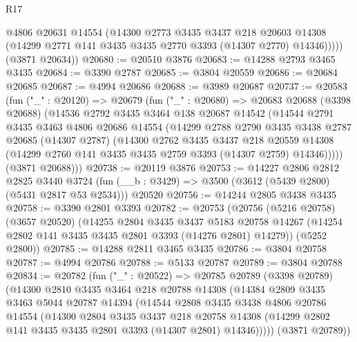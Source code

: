 \begin{lexlean}{R17}
\begin{coremodule}
            @4806
            @20631
            @14554
            (@14300
              @2773
              @3435
              @3437
              @218
              @20603
              @14308
              (@14299 @2771 @141 @3435 @3435 @2770 @3393 (@14307 @2770) @14346)))))
      (@3871 @20634))
@20680 := @20510 @3876
@20683 := @14288 @2793 @3465 @3435
@20684 := @3390 @2787
@20685 := @3804 @20559
@20686 := @20684 @20685
@20687 := @4994 @20686
@20688 := @3989 @20687
@20737 := @20583
    (fun ("_" : @20120) =>
    @20679
      (fun ("_" : @20680) =>
      @20683
        @20688
        (@3398 @20688)
        (@14536
          @2792
          @3435
          @3464
          @138
          @20687
          @14542
          (@14544
            @2791
            @3435
            @3463
            @4806
            @20686
            @14554
            (@14299
              @2788
              @2790
              @3435
              @3438
              @2787
              @20685
              (@14307 @2787)
              (@14300
                @2762
                @3435
                @3437
                @218
                @20559
                @14308
                (@14299 @2760 @141 @3435 @3435 @2759 @3393 (@14307 @2759) @14346)))))
        (@3871 @20688)))
@20738 := @20119 @3876
@20753 := @14227
    @2806
    @2812
    @2825
    @3440
    @3724
    (fun (__b : @3429) => @3500 (@3612 (@5439 @2800) (@5431 @2817 @53 @2534)))
    @20520
@20756 := @14244 @2805 @3438 @3435
@20758 := @3390 @2801 @3393
@20782 := @20753
    (@20756
      (@5216 @20758)
      (@3657 @20520)
      (@14255
        @2804
        @3435
        @3437
        @5183
        @20758
        @14267
        (@14254 @2802 @141 @3435 @3435 @2801 @3393 (@14276 @2801) @14279))
      (@5252 @2800))
@20785 := @14288 @2811 @3465 @3435
@20786 := @3804 @20758
@20787 := @4994 @20786
@20788 := @5133 @20787
@20789 := @3804 @20788
@20834 := @20782
    (fun ("_" : @20522) =>
    @20785
      @20789
      (@3398 @20789)
      (@14300
        @2810
        @3435
        @3464
        @218
        @20788
        @14308
        (@14384
          @2809
          @3435
          @3463
          @5044
          @20787
          @14394
          (@14544
            @2808
            @3435
            @3438
            @4806
            @20786
            @14554
            (@14300
              @2804
              @3435
              @3437
              @218
              @20758
              @14308
              (@14299 @2802 @141 @3435 @3435 @2801 @3393 (@14307 @2801) @14346)))))
      (@3871 @20789))

\end{coremodule}
\end{lexlean}
